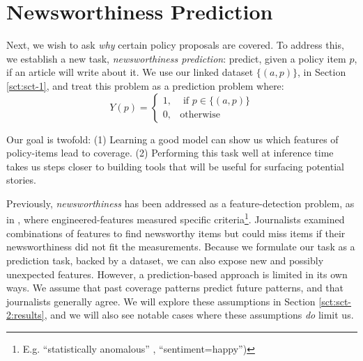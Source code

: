 \documentclass[11pt]{article}
\begin{document}
\section{Newsworthiness Prediction}
\label{sct:sct-2}

Next, we wish to ask \textit{why} certain policy proposals are covered. To address this, we establish a new task, \textit{newsworthiness prediction}: predict, given a policy item $p$, if an article will write about it. We use our linked dataset  $\{(a, p)\}$, in Section \ref{sct:sct-1}, and treat this problem as a prediction problem where:
\begin{equation}
Y(p) =
\begin{cases}
  1, & \text{ if } p \in \{(a, p)\} \\
  0, & \text{otherwise}
\end{cases}
\label{eq:newsworthiness-label}
\end{equation}

Our goal is twofold: (1) Learning a good model can show us which features of policy-items lead to coverage. (2) Performing this task well at inference time takes us steps closer to building tools that will be useful for surfacing potential stories.

Previously, \textit{newsworthiness} has been addressed as a feature-detection problem, as in \cite{diakopoulos2010diamonds}, where engineered-features measured specific criteria\footnote{E.g. ``statistically anomalous'' \cite{zhao2014fluxflow}, ``sentiment=happy'')}. Journalists examined combinations of features to find newsworthy items but could miss items if their newsworthiness did not fit the measurements. Because we formulate our task as a prediction task, backed by a dataset, we can also expose new and possibly unexpected features. However, a prediction-based approach is limited in its own ways. We assume that past coverage patterns predict future patterns, and that journalists generally agree. We will explore these assumptions in Section \ref{sct:sct-2:results}, and we will also see notable cases where these assumptions \textit{do} limit us.
\end{document}
